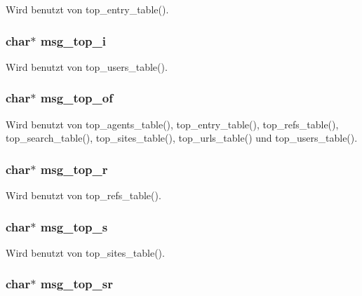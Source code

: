 Wird benutzt von top\_\-entry\_\-table().
\subsubsection{\setlength{\rightskip}{0pt plus 5cm}char$\ast$ {\bf msg\_\-top\_\-i}}\label{lang_8h_41943ef3550158b5d1b0eaa79bad301a}




Wird benutzt von top\_\-users\_\-table().
\subsubsection{\setlength{\rightskip}{0pt plus 5cm}char$\ast$ {\bf msg\_\-top\_\-of}}\label{lang_8h_b3bbb0a05acd36a0ca6f294ddedf5576}




Wird benutzt von top\_\-agents\_\-table(), top\_\-entry\_\-table(), top\_\-refs\_\-table(), top\_\-search\_\-table(), top\_\-sites\_\-table(), top\_\-urls\_\-table() und top\_\-users\_\-table().
\subsubsection{\setlength{\rightskip}{0pt plus 5cm}char$\ast$ {\bf msg\_\-top\_\-r}}\label{lang_8h_83e30a010661cb0cfce5f54890d50b56}




Wird benutzt von top\_\-refs\_\-table().
\subsubsection{\setlength{\rightskip}{0pt plus 5cm}char$\ast$ {\bf msg\_\-top\_\-s}}\label{lang_8h_56698ea4f9c0b356cf97ee37ff53ff2f}




Wird benutzt von top\_\-sites\_\-table().
\subsubsection{\setlength{\rightskip}{0pt plus 5cm}char$\ast$ {\bf msg\_\-top\_\-sr}}\label{lang_8h_ac25e2239379aa97235561ba1b44c6ef}




